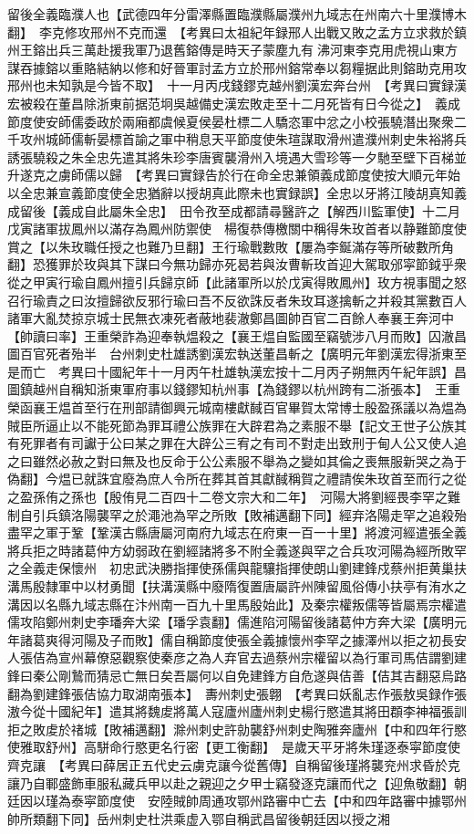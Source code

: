 留後全義臨濮人也【武德四年分雷澤縣置臨濮縣屬濮州九域志在州南六十里濮博木翻】　李克修攻邢州不克而還　【考異曰太祖紀年録邢人出戰又敗之孟方立求救於鎮州王鎔出兵三萬赴援我軍乃退舊鎔傳是時天子蒙塵九有沸河東李克用虎視山東方謀吞據鎔以重賂結納以修和好晉軍討孟方立於邢州鎔常奉以芻糧据此則鎔助克用攻邢州也未知孰是今皆不取】　十一月丙戌錢鏐克越州劉漢宏奔台州　【考異曰實録漢宏被殺在董昌除浙東前据范坰吳越備史漢宏敗走至十二月死皆有日今從之】　義成節度使安師儒委政於兩廂都虞候夏侯晏杜標二人驕恣軍中忿之小校張驍潛出聚衆二千攻州城師儒斬晏標首諭之軍中稍息天平節度使朱瑄謀取滑州遣濮州刺史朱裕將兵誘張驍殺之朱全忠先遣其將朱珍李唐賓襲滑州入境遇大雪珍等一夕馳至壁下百梯並升遂克之虜師儒以歸　【考異曰實録告於行在命全忠兼領義成節度使按大順元年始以全忠兼宣義節度使全忠猶辭以授胡真此際未也實録誤】全忠以牙將江陵胡真知義成留後【義成自此屬朱全忠】　田令孜至成都請尋醫許之【解西川監軍使】十二月戊寅諸軍拔鳳州以滿存為鳳州防禦使　楊復恭傳檄關中稱得朱玫首者以静難節度使賞之【以朱玫職任授之也難乃旦翻】王行瑜戰數敗【屢為李鋋滿存等所破數所角翻】恐獲罪於玫與其下謀曰今無功歸亦死曷若與汝曹斬玫首迎大駕取邠寜節鉞乎衆從之甲寅行瑜自鳳州擅引兵歸京師【此諸軍所以於戊寅得敗鳳州】玫方視事聞之怒召行瑜責之曰汝擅歸欲反邪行瑜曰吾不反欲誅反者朱玫耳遂擒斬之并殺其黨數百人諸軍大亂焚掠京城士民無衣凍死者蔽地裴澈鄭昌圖帥百官二百餘人奉襄王奔河中【帥讀曰率】王重榮詐為迎奉執煴殺之【襄王煴自監國至竊號涉八月而敗】囚澈昌圖百官死者殆半　台州刺史杜雄誘劉漢宏執送董昌斬之【廣明元年劉漢宏得浙東至是而亡　考異曰十國紀年十一月丙午杜雄執漢宏按十二月丙子朔無丙午紀年誤】昌圖鎮越州自稱知浙東軍府事以錢鏐知杭州事【為錢鏐以杭州跨有二浙張本】　王重榮函襄王煴首至行在刑部請御興元城南樓獻馘百官畢賀太常博士殷盈孫議以為煴為賊臣所逼止以不能死節為罪耳禮公族罪在大辟君為之素服不舉【記文王世子公族其有死罪者有司讞于公曰某之罪在大辟公三宥之有司不對走出致刑于甸人公又使人追之曰雖然必赦之對曰無及也反命于公公素服不舉為之變如其倫之喪無服新哭之為于偽翻】今煴已就誅宜廢為庶人令所在葬其首其獻馘稱賀之禮請俟朱玫首至而行之從之盈孫侑之孫也【殷侑見二百四十二卷文宗大和二年】　河陽大將劉經畏李罕之難制自引兵鎮洛陽襲罕之於澠池為罕之所敗【敗補邁翻下同】經弃洛陽走罕之追殺殆盡罕之軍于鞏【鞏漢古縣唐屬河南府九域志在府東一百一十里】將渡河經遣張全義將兵拒之時諸葛仲方幼弱政在劉經諸將多不附全義遂與罕之合兵攻河陽為經所敗罕之全義走保懷州　初忠武決勝指揮使孫儒與龍驤指揮使朗山劉建鋒戍蔡州拒黄巢扶溝馬殷隸軍中以材勇聞【扶溝漢縣中廢隋復置唐屬許州陳留風俗傳小扶亭有洧水之溝因以名縣九域志縣在汴州南一百九十里馬殷始此】及秦宗權叛儒等皆屬焉宗權遣儒攻陷鄭州刺史李璠奔大梁【璠孚袁翻】儒進陷河陽留後諸葛仲方奔大梁【廣明元年諸葛爽得河陽及子而敗】儒自稱節度使張全義據懷州李罕之據澤州以拒之初長安人張佶為宣州幕僚惡觀察使秦彦之為人弃官去過蔡州宗權留以為行軍司馬佶謂劉建鋒曰秦公剛鷙而猜忌亡無日矣吾屬何以自免建鋒方自危遂與佶善【佶其吉翻惡烏路翻為劉建鋒張佶協力取湖南張本】　夀州刺史張翺　【考異曰妖亂志作張敖吳録作張滶今從十國紀年】遣其將魏䖍將萬人寇廬州廬州刺史楊行愍遣其將田頵李神福張訓拒之敗䖍於禇城【敗補邁翻】滁州刺史許勍襲舒州刺史陶雅奔廬州【中和四年行愍使雅取舒州】高駢命行愍更名行密【更工衡翻】　是歲天平牙將朱瑾逐泰寜節度使齊克讓　【考異曰薛居正五代史云虜克讓今從舊傳】自稱留後瑾將襲兖州求昏於克讓乃自鄆盛飾車服私藏兵甲以赴之親迎之夕甲士竊發逐克讓而代之【迎魚敬翻】朝廷因以瑾為泰寜節度使　安陸賊帥周通攻鄂州路審中亡去【中和四年路審中據鄂州帥所類翻下同】岳州刺史杜洪乘虚入鄂自稱武昌留後朝廷因以授之湘